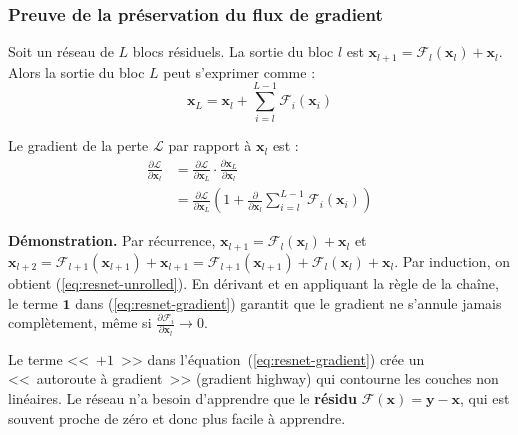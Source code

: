 \subsubsection{Preuve de la pr\'eservation du flux de gradient}

\begin{theoreme}
\label{thm:resnet-gradient}
Soit un r\'eseau de $L$ blocs r\'esiduels. La sortie du bloc $l$ est
$\mathbf{x}_{l+1} = \mathcal{F}_l(\mathbf{x}_l) + \mathbf{x}_l$. Alors
la sortie du bloc $L$ peut s'exprimer comme :
\begin{equation}
\mathbf{x}_L = \mathbf{x}_l + \sum_{i=l}^{L-1} \mathcal{F}_i(\mathbf{x}_i)
\label{eq:resnet-unrolled}
\end{equation}

Le gradient de la perte $\mathcal{L}$ par rapport \`a $\mathbf{x}_l$ est :
\begin{align}
\frac{\partial \mathcal{L}}{\partial \mathbf{x}_l}
&= \frac{\partial \mathcal{L}}{\partial \mathbf{x}_L}
   \cdot \frac{\partial \mathbf{x}_L}{\partial \mathbf{x}_l} \nonumber \\
&= \frac{\partial \mathcal{L}}{\partial \mathbf{x}_L}
   \left(1 + \frac{\partial}{\partial \mathbf{x}_l}
   \sum_{i=l}^{L-1} \mathcal{F}_i(\mathbf{x}_i)\right)
\label{eq:resnet-gradient}
\end{align}

\textbf{D\'emonstration.}
Par r\'ecurrence, $\mathbf{x}_{l+1} = \mathcal{F}_l(\mathbf{x}_l) + \mathbf{x}_l$
et $\mathbf{x}_{l+2} = \mathcal{F}_{l+1}(\mathbf{x}_{l+1}) + \mathbf{x}_{l+1}
= \mathcal{F}_{l+1}(\mathbf{x}_{l+1}) + \mathcal{F}_l(\mathbf{x}_l) + \mathbf{x}_l$.
Par induction, on obtient (\ref{eq:resnet-unrolled}). En d\'erivant et en
appliquant la r\`egle de la cha\^ine, le terme $\mathbf{1}$ dans
(\ref{eq:resnet-gradient}) garantit que le gradient ne s'annule jamais
compl\`etement, m\^eme si $\frac{\partial \mathcal{F}_i}{\partial \mathbf{x}_l}
\to 0$.
\end{theoreme}

\begin{intuition}[title=\textbf{Pourquoi ResNet fonctionne}]
Le terme <<~$+1$~>> dans l'\'equation~(\ref{eq:resnet-gradient}) cr\'ee un
<<~autoroute \`a gradient~>> (gradient highway) qui contourne les couches
non lin\'eaires. Le r\'eseau n'a besoin d'apprendre que le \textbf{r\'esidu}
$\mathcal{F}(\mathbf{x}) = \mathbf{y} - \mathbf{x}$, qui est souvent proche
de z\'ero et donc plus facile \`a apprendre.
\end{intuition}

